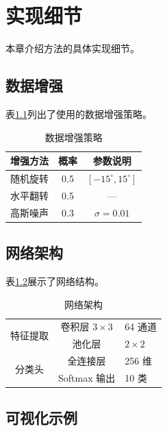%
%
%

\chapter{实现细节}
\label{chap:implementation}

本章介绍方法的具体实现细节。

\section{数据增强}
\label{sec:augmentation}

表\ref{tab:aug}列出了使用的数据增强策略。

\begin{table}[htbp]
\centering
\caption{数据增强策略}
\label{tab:aug}
\begin{tabular}{lcc}
\toprule
增强方法 & 概率 & 参数说明 \\
\midrule
随机旋转 & 0.5 & \([-15^\circ, 15^\circ]\) \\
水平翻转 & 0.5 & — \\
高斯噪声 & 0.3 & \(\sigma = 0.01\) \\
\bottomrule
\end{tabular}
\end{table}

\section{网络架构}
\label{sec:arch}

表\ref{tab:arch}展示了网络结构。

\begin{table}[htbp]
\centering
\caption{网络架构}
\label{tab:arch}
\begin{tabular}{ccl}
\toprule
\multirow{2}{*}{特征提取}
& 卷积层 \(3\times3\) & 64 通道 \\
& 池化层 & \(2\times2\) \\
\midrule
\multirow{2}{*}{分类头}
& 全连接层 & 256 维 \\
& Softmax 输出 & 10 类 \\
\bottomrule
\end{tabular}
\end{table}

\section{可视化示例}
\label{sec:vis}

